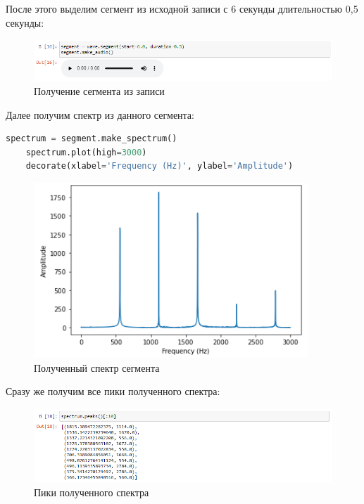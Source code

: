 \documentclass[a4paper]{article}
\begin{document}
            После этого выделим сегмент из исходной записи с 6 секунды длительностью 0,5 секунды:
            
            \begin{figure}[H]
                \centering
                \includegraphics[width=\textwidth]{ex_4_segment_audio.png}
                \caption{Получение сегмента из записи}
                \label{fig:ex_4_segment_audio}
            \end{figure}
            
            Далее получим спектр из данного сегмента:
            
\begin{lstlisting}[language=Python, caption= Получение спектра сегмента]
    spectrum = segment.make_spectrum()
    spectrum.plot(high=3000)
    decorate(xlabel='Frequency (Hz)', ylabel='Amplitude')
\end{lstlisting}               
            
            \begin{figure}[H]
                \centering
                \includegraphics{ex_4_spectr.png}
                \caption{Полученный спектр сегмента}
                \label{fig:ex_4_spectr}
            \end{figure}
            
            Сразу же получим все пики полученного спектра:
            
            \begin{figure}[H]
                \centering
                \includegraphics[width=\textwidth]{ex_4_spectr_peaks.png}
                \caption{Пики полученного спектра}
                \label{fig:ex_4_spectr_peaks}
            \end{figure}
            
\end{document}

